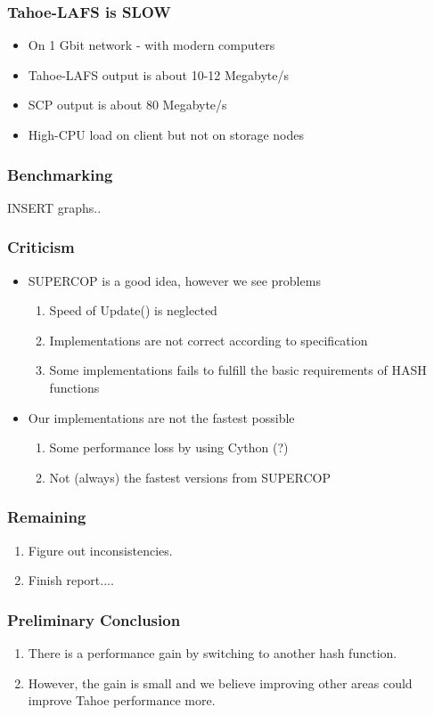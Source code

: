 \documentclass[screen]{beamer}
\begin{document}
\begin{frame}
    \frametitle{Tahoe-LAFS is SLOW}
    \begin{itemize}
        \item On 1 Gbit network - with modern computers
        \item Tahoe-LAFS output is about 10-12 Megabyte/s
        \item SCP output is about 80 Megabyte/s
        \item High-CPU load on client but not on storage nodes
    \end{itemize}
\end{frame}

\begin{frame}
    \frametitle{Benchmarking}

    INSERT graphs.. %
\end{frame}

\begin{frame}
    \frametitle{Criticism}
    \begin{itemize}
        \item SUPERCOP is a good idea, however we see problems
            \begin{enumerate}
                \item Speed of Update() is neglected
                \item Implementations are not correct according to specification
                \item Some implementations fails to fulfill the basic requirements
                of HASH functions
            \end{enumerate}
        \item Our implementations are not the fastest possible
            \begin{enumerate}
                \item Some performance loss by using Cython (?)
                \item Not (always) the fastest versions from SUPERCOP
            \end{enumerate}
    \end{itemize}
\end{frame}

\begin{frame}
    \frametitle{Remaining}
    \begin{enumerate}
        \item Figure out inconsistencies.
        \item Finish report....
    \end{enumerate}
\end{frame}

\begin{frame}
    \frametitle{Preliminary Conclusion}
    \begin{enumerate}
        \item There is a performance gain by switching to another hash
        function.
        \item However, the gain is small and we believe improving other areas
        could improve Tahoe performance more.
    \end{enumerate}
\end{frame}
\end{document}
